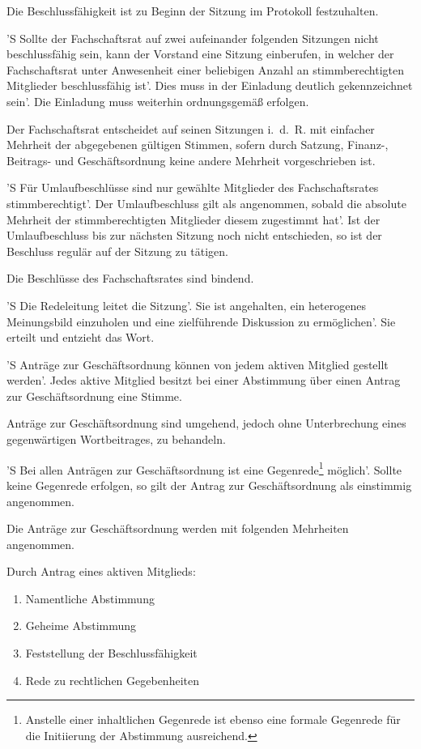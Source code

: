 \documentclass[%
	parskip=half,
]{scrartcl}
\newcounter{enumitem}
\begin{document}
\begin{contract}
Die Beschlussfähigkeit ist zu Beginn der Sitzung im Protokoll festzuhalten.

'S Sollte der Fachschaftsrat auf zwei aufeinander folgenden Sitzungen nicht beschlussfähig sein, kann der Vorstand eine
Sitzung einberufen, in welcher der Fachschaftsrat unter Anwesenheit einer beliebigen Anzahl an stimmberechtigten
Mitglieder beschlussfähig ist'. Dies muss in der Einladung deutlich gekennzeichnet sein'. Die Einladung muss weiterhin
ordnungsgemäß erfolgen.

Der Fachschaftsrat entscheidet auf seinen Sitzungen i.~d.~R. mit einfacher Mehrheit der abgegebenen gültigen Stimmen, 
sofern durch Satzung, Finanz-, Beitrags- und Geschäftsordnung keine andere Mehrheit vorgeschrieben ist.

'S Für Umlaufbeschlüsse sind nur gewählte Mitglieder des Fachschaftsrates stimmberechtigt'. Der Umlaufbeschluss gilt als
angenommen, sobald die absolute Mehrheit der stimmberechtigten Mitglieder diesem zugestimmt hat'. Ist der
Umlaufbeschluss bis zur nächsten Sitzung noch nicht entschieden, so ist der Beschluss regulär auf der Sitzung zu
tätigen.

Die Beschlüsse des Fachschaftsrates sind bindend.


'S Die Redeleitung leitet die Sitzung'. Sie ist angehalten, ein heterogenes Meinungsbild einzuholen und eine
zielführende Diskussion zu ermöglichen'. Sie erteilt und entzieht das Wort.


'S Anträge zur Geschäftsordnung können von jedem aktiven Mitglied gestellt werden'. Jedes aktive Mitglied besitzt bei
einer Abstimmung über einen Antrag zur Geschäftsordnung eine Stimme.

Anträge zur Geschäftsordnung sind umgehend, jedoch ohne Unterbrechung eines gegenwärtigen Wortbeitrages, zu behandeln.

'S Bei allen Anträgen zur Geschäftsordnung ist eine Gegenrede\footnote{Anstelle einer inhaltlichen Gegenrede 
ist ebenso eine formale Gegenrede für die Initiierung der Abstimmung ausreichend.} möglich'. Sollte keine Gegenrede 
erfolgen, so gilt der Antrag zur Geschäftsordnung als einstimmig angenommen.

Die Anträge zur Geschäftsordnung werden mit folgenden Mehrheiten angenommen.


Durch Antrag eines aktiven Mitglieds:
\begin{enumerate}[\qquad a)]
	\item Namentliche Abstimmung
	\item Geheime Abstimmung
	\item Feststellung der Beschlussfähigkeit
	\item Rede zu rechtlichen Gegebenheiten
	\setcounter{enumitem}{\value{enumi}}
\end{enumerate}


\end{contract}
\end{document}
